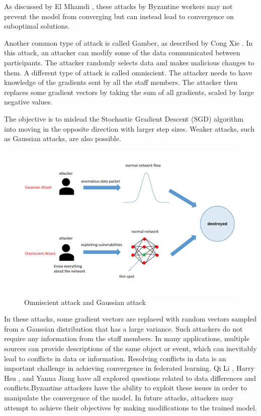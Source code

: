 \documentclass[conference]{IEEEtran}
\begin{document}
As discussed by El Mhamdi \cite{b120}, these attacks by Byzantine workers may not prevent the model from converging but can instead
lead to convergence on suboptimal solutions.

Another common type of attack is called Gamber, as described by Cong Xie \cite{b121}.
In this attack, an attacker can modify some of the data communicated between participants.
The attacker randomly selects data and makes malicious changes to them.
A different type of attack is called omniscient.
The attacker needs to have knowledge of the gradients sent by all the staff members.
The attacker then replaces some gradient vectors by taking the sum of all gradients, scaled by large negative values.

The objective is to mislead the Stochastic Gradient Descent (SGD) algorithm into moving in the opposite direction with larger step sizes.
Weaker attacks, such as Gaussian attacks, are also possible.

\begin{figure}[htbp]
    \centerline{\includegraphics[width=0.8\linewidth,height=0.6\linewidth]{picture/gause.jpg}}
    \caption{Omniscient attack and Gaussian attack}
    \label{fig14}
\end{figure}

In these attacks, some gradient vectors are replaced with random vectors sampled from a Gaussian distribution that has a large variance.
Such attackers do not require any information from the staff members.
In many applications, multiple sources can provide descriptions of the same object or event, which can inevitably
lead to conflicts in data or information. Resolving conflicts in data is an important challenge in
achieving convergence in federated learning. Qi Li \cite{b122}, Harry Hsu \cite{b123}, and Yanna Jiang \cite{b124} have all
explored questions related to data differences and conflicts.Byzantine attackers have the ability to exploit these
issues in order to manipulate the convergence of the model.
In future attacks, attackers may attempt to achieve their objectives by making modifications to the trained model.
\end{document}
